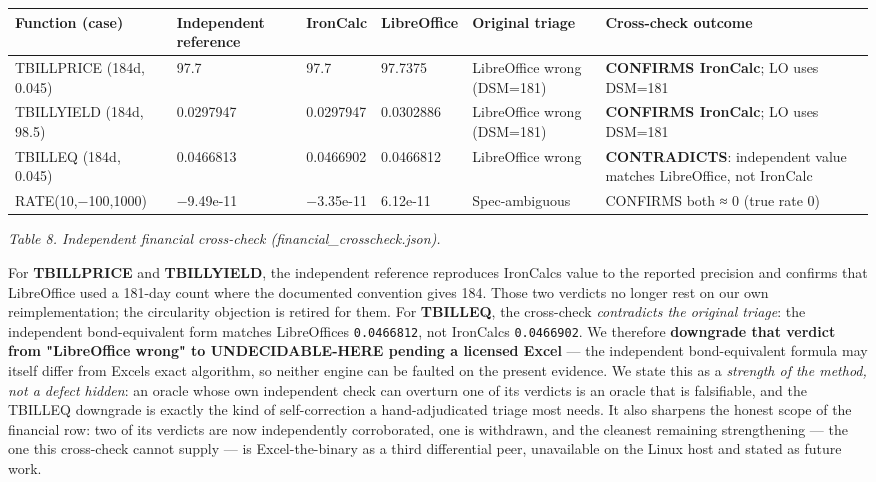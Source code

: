 \documentclass[
]{article}
\newcounter{none} %
\begin{document}
{\def\LTcaptype{none} %
\begin{longtable}[]{@{}llllll@{}}
\toprule\noalign{}
Function (case) & Independent reference & IronCalc & LibreOffice &
Original triage & Cross-check outcome \\
\midrule\noalign{}
\endhead
\bottomrule\noalign{}
\endlastfoot
TBILLPRICE (184d, 0.045) & 97.7 & 97.7 & 97.7375 & LibreOffice wrong
(DSM=181) & \textbf{CONFIRMS IronCalc}; LO uses DSM=181 \\
TBILLYIELD (184d, 98.5) & 0.0297947 & 0.0297947 & 0.0302886 &
LibreOffice wrong (DSM=181) & \textbf{CONFIRMS IronCalc}; LO uses
DSM=181 \\
TBILLEQ (184d, 0.045) & 0.0466813 & 0.0466902 & 0.0466812 & LibreOffice
wrong & \textbf{CONTRADICTS}: independent value matches LibreOffice, not
IronCalc \\
RATE(10,−100,1000) & −9.49e-11 & −3.35e-11 & 6.12e-11 & Spec-ambiguous &
CONFIRMS both ≈ 0 (true rate 0) \\
\end{longtable}
}

\emph{Table 8. Independent financial cross-check
(financial\_crosscheck.json).}

For \textbf{TBILLPRICE} and \textbf{TBILLYIELD}, the independent
reference reproduces IronCalc\textquotesingle s value to the reported
precision and confirms that LibreOffice used a 181-day count where the
documented convention gives 184. Those two verdicts no longer rest on
our own reimplementation; the circularity objection is retired for them.
For \textbf{TBILLEQ}, the cross-check \emph{contradicts the original
triage}: the independent bond-equivalent form matches
LibreOffice\textquotesingle s \texttt{0.0466812}, not
IronCalc\textquotesingle s \texttt{0.0466902}. We therefore
\textbf{downgrade that verdict from "LibreOffice wrong" to
UNDECIDABLE-HERE pending a licensed Excel} --- the independent
bond-equivalent formula may itself differ from Excel\textquotesingle s
exact algorithm, so neither engine can be faulted on the present
evidence. We state this as a \emph{strength of the method, not a defect
hidden}: an oracle whose own independent check can overturn one of its
verdicts is an oracle that is falsifiable, and the TBILLEQ downgrade is
exactly the kind of self-correction a hand-adjudicated triage most
needs. It also sharpens the honest scope of the financial row: two of
its verdicts are now independently corroborated, one is withdrawn, and
the cleanest remaining strengthening --- the one this cross-check cannot
supply --- is Excel-the-binary as a third differential peer, unavailable
on the Linux host and stated as future work.
\end{document}
